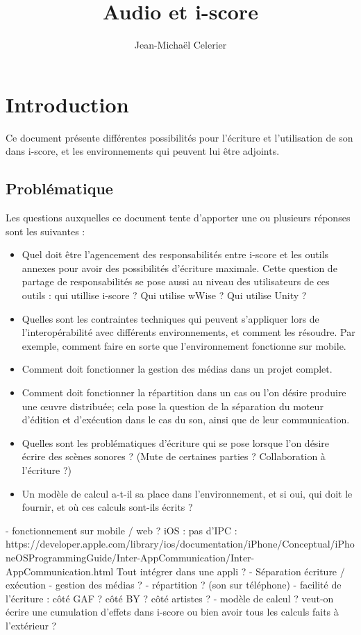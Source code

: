 \documentclass[french,12pt,a4paper]{article}
\title{Audio et i-score}
\author{Jean-Michaël Celerier}
\begin{document}
\maketitle

\section{Introduction}
Ce document présente différentes possibilités 
pour l'écriture et l'utilisation de son dans i-score, 
et les environnements qui peuvent lui être adjoints.

\subsection{Problématique}
Les questions auxquelles ce document tente d'apporter une ou plusieurs réponses sont les suivantes : 
\begin{itemize}
    \item Quel doit être l'agencement des responsabilités entre i-score et les outils annexes pour avoir des possibilités d'écriture maximale.
    Cette question de partage de responsabilités se pose aussi au niveau des utilisateurs de ces outils : qui utillise i-score ? Qui utilise wWise ? Qui utilise Unity ? 
    \item Quelles sont les contraintes techniques qui peuvent s'appliquer lors de l'interopérabilité avec différents environnements, et comment les résoudre. 
    Par exemple, comment faire en sorte que l'environnement fonctionne sur mobile.
    \item Comment doit fonctionner la gestion des médias dans un projet complet.
    \item Comment doit fonctionner la répartition dans un cas ou l'on désire produire une \oe uvre distribuée; cela pose la question de la séparation du moteur d'édition et d'exécution dans le cas du son, ainsi que de leur communication.
    \item Quelles sont les problématiques d'écriture qui se pose lorsque l'on désire écrire des scènes sonores ? (Mute de certaines parties ? Collaboration à l'écriture ?)
    \item Un modèle de calcul a-t-il sa place dans l'environnement, et si oui, qui doit le fournir, et où ces calculs sont-ils écrits ?
    
\end{itemize}
- fonctionnement sur mobile / web ? iOS : pas d'IPC : https://developer.apple.com/library/ios/documentation/iPhone/Conceptual/iPhoneOSProgrammingGuide/Inter-AppCommunication/Inter-AppCommunication.html
Tout intégrer dans une appli ?
- Séparation écriture / exécution
- gestion des médias ?
- répartition ? (son sur téléphone)
- facilité de l'écriture : côté GAF ? côté BY ? côté artistes ?
- modèle de calcul ? veut-on écrire une cumulation d'effets dans i-score 
ou bien avoir tous les calculs faits à l'extérieur ?
\end{document}
